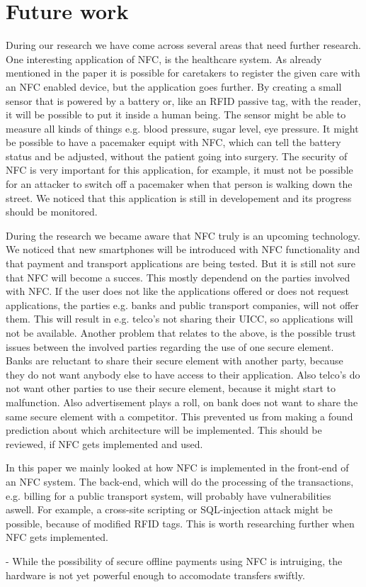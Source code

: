\section{Future work}
\label{chap:future_work}

During our research we have come across several areas that need further research.
One interesting application of NFC, is the healthcare system. As already mentioned in the paper it is possible for caretakers to register the given care with an NFC enabled device, but the application goes further. By creating a small sensor that is powered by a battery or, like an RFID passive tag, with the reader, it will be possible to put it inside a human being. The sensor might be able to measure all kinds of things e.g. blood pressure, sugar level, eye pressure. It might be possible to have a pacemaker equipt with NFC, which can tell the battery status and be adjusted, without the patient going into surgery. 
The security of NFC is very important for this application, for example, it must not be possible for an attacker to switch off a pacemaker when that person is walking down the street. 
We noticed that this application is still in developement and its progress should be monitored.


During the research we became aware that NFC truly is an upcoming technology. We noticed that new smartphones will be introduced with NFC functionality and that payment and transport applications are being tested. But it is still not sure that NFC will become a succes. This mostly dependend on the parties involved with NFC. If the user does not like the applications offered or does not request applications, the parties e.g. banks and public transport companies, will not offer them. This will result in e.g. telco's not sharing their UICC, so applications will not be available. 
Another problem that relates to the above, is the possible trust issues between the involved parties regarding the use of one secure element. Banks are reluctant to share their secure element with another party, because they do not want anybody else to have access to their application. Also telco's do not want other parties to use their secure element, because it might start to malfunction. Also advertisement plays a roll, on bank does not want to share the same secure element with a competitor.
This prevented us from making a found prediction about which architecture will be implemented. This should be reviewed, if NFC gets implemented and used.

In this paper we mainly looked at how NFC is implemented in the front-end of an NFC system. The back-end, which will do the processing of the transactions, e.g. billing for a public transport system, will probably have vulnerabilities aswell. For example, a cross-site scripting or SQL-injection attack might be possible, because of modified RFID tags.\cite{rieback2006your} This is worth researching further when NFC gets implemented.

- While the possibility of secure offline payments using NFC is intruiging, the hardware is not yet powerful enough to accomodate transfers swiftly.
